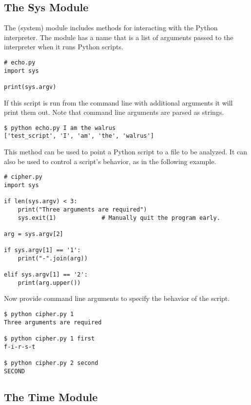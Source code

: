 \subsection*{The Sys Module}

The  (system) module includes methods for interacting with the Python interpreter.
The module has a name  that is a list of arguments passed to the interpreter when it runs Python scripts.

\begin{lstlisting}
# echo.py
import sys

print(sys.argv)
\end{lstlisting}

If this script is run from the command line with additional arguments it will print them out.
Note that command line arguments are parsed as strings.

\begin{lstlisting}
$ python echo.py I am the walrus
['test_script', 'I', 'am', 'the', 'walrus']
\end{lstlisting}

This method can be used to point a Python script to a file to be analyzed.
It can also be used to control a script's behavior, as in the following example.

\begin{lstlisting}
# cipher.py
import sys

if len(sys.argv) < 3:
    print("Three arguments are required")
    sys.exit(1)             # Manually quit the program early.

arg = sys.argv[2]

if sys.argv[1] == '1':
    print("-".join(arg))

elif sys.argv[1] == '2':
    print(arg.upper())
\end{lstlisting}

Now provide command line arguments to specify the behavior of the script.

\begin{lstlisting}
$ python cipher.py 1
Three arguments are required

$ python cipher.py 1 first
f-i-r-s-t

$ python cipher.py 2 second
SECOND
\end{lstlisting}

\subsection*{The Time Module}

